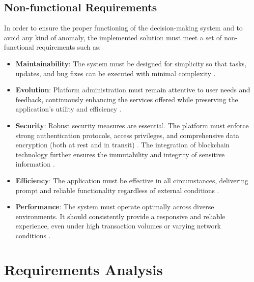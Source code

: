 \subsection{Non-functional Requirements}

In order to ensure the proper functioning of the decision-making system and to avoid any kind of anomaly, the implemented solution must meet a set of non-functional requirements such as:

\begin{itemize}
    \item \textbf{Maintainability}: The system must be designed for simplicity so that tasks, updates, and bug fixes can be executed with minimal complexity \cite{DevOpsFoundation2023, FowlerRefactoring2018}.
    
    \item \textbf{Evolution}: Platform administration must remain attentive to user needs and feedback, continuously enhancing the services offered while preserving the application's utility and efficiency \cite{PoppendieckLean2012, KnibergLeanStartup2013}.
    
    \item \textbf{Security}: Robust security measures are essential. The platform must enforce strong authentication protocols, access privileges, and comprehensive data encryption (both at rest and in transit) \cite{ClerkAuthenticationDocs, OWASPSecurityPrinciples2021}. The integration of blockchain technology further ensures the immutability and integrity of sensitive information \cite{WangBlockchainRealEstate2023, McKinseyBlockchainRE2023}.
    
    \item \textbf{Efficiency}: The application must be effective in all circumstances, delivering prompt and reliable functionality regardless of external conditions \cite{KimDevOpsMethods2018, BassArchitecture2021}.
    
    \item \textbf{Performance}: The system must operate optimally across diverse environments. It should consistently provide a responsive and reliable experience, even under high transaction volumes or varying network conditions \cite{DockerArchitecture2023, ForsgreniDevOpsMetrics2023}.
\end{itemize} 

\section{Requirements Analysis}

